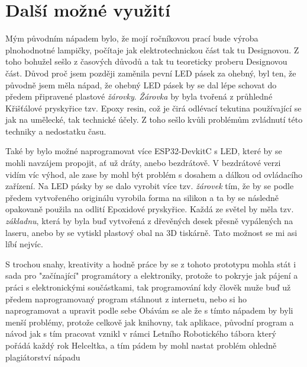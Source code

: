 \chapter{Další možné využití}

Mým původním nápadem bylo, že mojí ročníkovou prací bude výroba plnohodnotné lampičky, počítaje jak elektrotechnickou část tak tu Designovou. Z toho bohužel sešlo z časových důvodů a tak tu teoreticky proberu Designovou část. 
Důvod proč jsem později zaměnila pevní LED pásek za ohebný, byl ten, že původně jsem měla nápad, že ohebný LED pásek by se dal lépe schovat do předem připravené plastové {\em žárovky}. 
{\em Žárovka} by byla tvořená z průhledné Křišťálové pryskyřice tzv. Epoxy resin\cite{epoxyresin}, což je čirá odlévací tekutina používající se jak na umělecké, tak technické účely. Z toho sešlo kvůli problémům zvládnutí této techniky a nedostatku času. 



Také by bylo možné naprogramovat více ESP32-DevkitC s LED, které by se mohli navzájem propojit, ať už dráty, anebo bezdrátově. V bezdrátové verzi vidím víc výhod, ale zase by mohl být problém s dosahem a dálkou od ovládacího zařízení. 
Na LED pásky by se dalo vyrobit více tzv. {\em žárovek} tím, že by se podle předem vytvořeného originálu vyrobila forma na silikon a ta by se následně opakovaně použila na odlití Epoxidové pryskyřice. Každá ze světel by měla tzv. {\em základnu}, která by byla buď vytvořená z dřevěných desek přesně vypálených na laseru, anebo by se vytiskl plastový obal na 3D tiskárně. Tato možnost se mi asi líbí nejvíc.

	

S trochou snahy, kreativity a hodně práce by se z tohoto prototypu mohla stát i sada pro "začínající" programátory a elektroniky, protože to pokryje jak pájení a práci s elektronickými součástkami, tak programování kdy člověk muže buď už předem naprogramovaný program stáhnout z internetu, nebo si ho naprogramovat a upravit podle sebe Obávám se ale že s tímto nápadem by byli menší problémy, protože celkově jak knihovny, tak aplikace, původní program a návod jak s tím pracovat vznikl v rámci Letního Robotického tábora který pořádá každý rok Helceltka, a tím pádem by mohl nastat problém ohledně plagiátorství nápadu 


